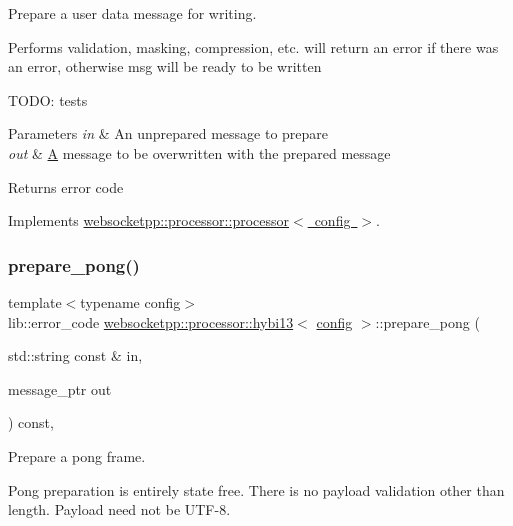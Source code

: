 Prepare a user data message for writing. 

Performs validation, masking, compression, etc. will return an error if there was an error, otherwise msg will be ready to be written

T\+O\+DO\+: tests


\begin{DoxyParams}{Parameters}
{\em in} & An unprepared message to prepare \\
\hline
{\em out} & \mbox{\hyperlink{struct_a}{A}} message to be overwritten with the prepared message \\
\hline
\end{DoxyParams}
\begin{DoxyReturn}{Returns}
error code 
\end{DoxyReturn}


Implements \mbox{\hyperlink{classwebsocketpp_1_1processor_1_1processor_a1345763249867d742390aa8e2076cb70}{websocketpp\+::processor\+::processor$<$ config $>$}}.

\mbox{\label{classwebsocketpp_1_1processor_1_1hybi13_ab5ca972653c126e7c6a05c529b394321}} 
\subsubsection{\texorpdfstring{prepare\+\_\+pong()}{prepare\_pong()}}
{\footnotesize\ttfamily template$<$typename config$>$ \\
lib\+::error\+\_\+code \mbox{\hyperlink{classwebsocketpp_1_1processor_1_1hybi13}{websocketpp\+::processor\+::hybi13}}$<$ \mbox{\hyperlink{classconfig}{config}} $>$\+::prepare\+\_\+pong (\begin{DoxyParamCaption}\item[{std\+::string const \&}]{in,  }\item[{message\+\_\+ptr}]{out }\end{DoxyParamCaption}) const\hspace{0.3cm}{\ttfamily [inline]}, {\ttfamily [virtual]}}



Prepare a pong frame. 

Pong preparation is entirely state free. There is no payload validation other than length. Payload need not be U\+T\+F-\/8.


